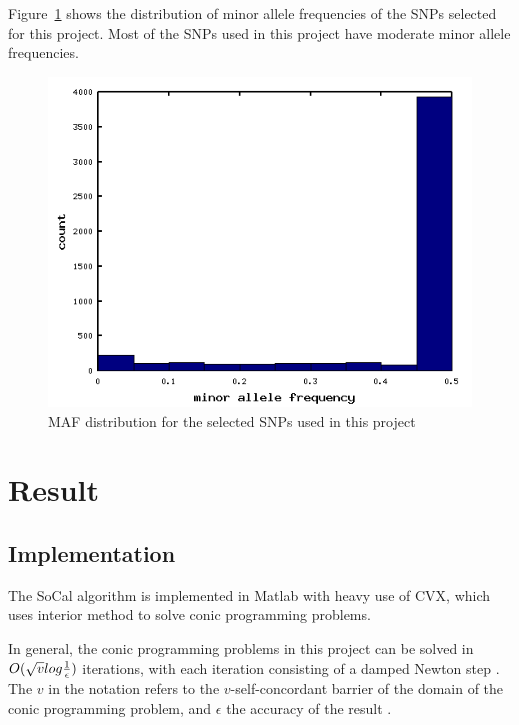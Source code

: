 \documentclass{scrartcl}
\begin{document}
\par
Figure~\ref{fig:data_mafdist} shows the distribution of minor allele
frequencies of the SNPs selected for this project.
Most of the SNPs used in this project have moderate minor allele frequencies.
\begin{figure}[H]
    \centering
    \includegraphics[scale=0.5]
    {data_figures/data_mafdist.png}
    \caption{MAF distribution for the selected SNPs used in this project}
    \label{fig:data_mafdist}
\end{figure}

\section{Result}

\subsection{Implementation}

\par
The SoCal algorithm is implemented in Matlab with heavy use of CVX, which uses
interior method to solve conic programming problems.

\par
In general, the conic programming problems in this project can be solved in 
$O(\sqrt{v}log{{1}\over{\epsilon}})$ iterations, with each iteration
consisting of a damped Newton step \cite{glineur1998}.
The $v$ in the notation refers to the $v$-self-concordant barrier of the domain
of the conic programming problem, and $\epsilon$ the accuracy of the 
result \cite{glineur1998}.
\end{document}
